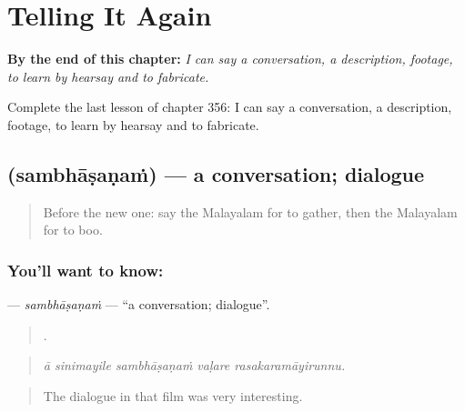 
\chapter{Telling It Again}
\label{ch:ml-telling-it-again}

\begin{chapteropening}
\textbf{By the end of this chapter:} \emph{I can say a conversation, a description, footage, to learn by hearsay and to fabricate.}

Complete the last lesson of chapter 356: I can say a conversation, a description, footage, to learn by hearsay and to fabricate.
\end{chapteropening}

\section[\texorpdfstring{\ml{സംഭാഷണം} (sambhāṣaṇaṁ)}{സംഭാഷണം (sambhāṣaṇaṁ)}]{ (sambhāṣaṇaṁ) — a conversation; dialogue}

\label{lesson:ML-C356-sambhasanam}



\begin{quote}
Before the new one: say the Malayalam for to gather, then the Malayalam for to boo.
\end{quote}

\subsection*{You'll want to know: }
\textbf{} — \emph{sambhāṣaṇaṁ} — \textquotedblleft{}a conversation; dialogue\textquotedblright{}.

\begin{quote}
    .
\end{quote}

\begin{quote}
\emph{ā sinimayile sambhāṣaṇaṁ vaḷare rasakaramāyirunnu.}
\end{quote}

\begin{quote}
The dialogue in that film was very interesting.
\end{quote}

